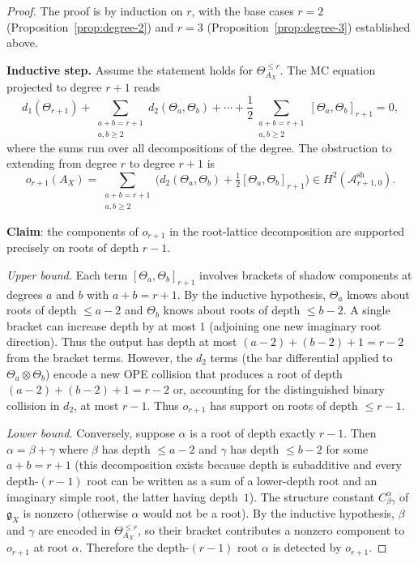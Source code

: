 \documentclass[11pt]{amsart}
\theoremstyle{definition}
\theoremstyle{remark}
\newcommand{\cA}{\mathcal{A}}
\newcommand{\fg}{\mathfrak{g}}
\begin{document}
\begin{proof}
The proof is by induction on $r$, with the base cases
$r = 2$ (Proposition~\ref{prop:degree-2}) and $r = 3$
(Proposition~\ref{prop:degree-3}) established above.

\medskip
\noindent\textbf{Inductive step.}
Assume the statement holds for $\Theta^{\leq r}_{A_X}$. The
MC equation projected to degree $r + 1$ reads
\begin{equation}\label{eq:mc-degree-r}
 d_1(\Theta_{r+1}) + \sum_{\substack{a+b = r+1 \\ a,b \geq 2}}
 d_2(\Theta_a, \Theta_b) + \cdots
 + \frac{1}{2}\sum_{\substack{a+b = r+1 \\ a,b \geq 2}}
 [\Theta_a, \Theta_b]_{r+1} = 0,
\end{equation}
where the sums run over all decompositions of the degree. The
obstruction to extending from degree $r$ to degree $r + 1$ is
\[
 o_{r+1}(A_X) = \sum_{\substack{a+b = r+1 \\ a,b \geq 2}}
 \bigl(d_2(\Theta_a, \Theta_b) +
 \tfrac{1}{2}[\Theta_a, \Theta_b]_{r+1}\bigr)
 \in H^2(\cA^{\mathrm{sh}}_{r+1,0}).
\]

\textbf{Claim}: the components of $o_{r+1}$ in the root-lattice
decomposition are supported precisely on roots of depth $r - 1$.

\emph{Upper bound.} Each term $[\Theta_a, \Theta_b]_{r+1}$
involves brackets of shadow components at degrees $a$ and $b$
with $a + b = r + 1$. By the inductive hypothesis, $\Theta_a$
knows about roots of depth $\leq a - 2$ and $\Theta_b$ knows
about roots of depth $\leq b - 2$. A single bracket can
increase depth by at most $1$ (adjoining one new imaginary root
direction). Thus the output has depth at most
$(a - 2) + (b - 2) + 1 = r - 2$ from the bracket terms.
However, the $d_2$ terms (the bar differential applied to
$\Theta_a \otimes \Theta_b$) encode a new OPE collision that
produces a root of depth $(a-2) + (b-2) + 1 = r - 2$ or,
accounting for the distinguished binary collision in $d_2$, at
most $r - 1$. Thus $o_{r+1}$ has support on roots of depth
$\leq r - 1$.

\emph{Lower bound.} Conversely, suppose $\alpha$ is a root of
depth exactly $r - 1$. Then $\alpha = \beta + \gamma$ where
$\beta$ has depth $\leq a - 2$ and $\gamma$ has depth
$\leq b - 2$ for some $a + b = r + 1$ (this decomposition
exists because depth is subadditive and every depth-$(r-1)$ root
can be written as a sum of a lower-depth root and an imaginary
simple root, the latter having depth~$1$). The structure
constant $C_{\beta\gamma}^\alpha$ of $\fg_X$ is nonzero
(otherwise $\alpha$ would not be a root). By the inductive
hypothesis, $\beta$ and $\gamma$ are encoded in
$\Theta^{\leq r}_{A_X}$, so their bracket contributes a
nonzero component to $o_{r+1}$ at root $\alpha$. Therefore
the depth-$(r-1)$ root $\alpha$ is detected by $o_{r+1}$.


\end{proof}
\end{document}
